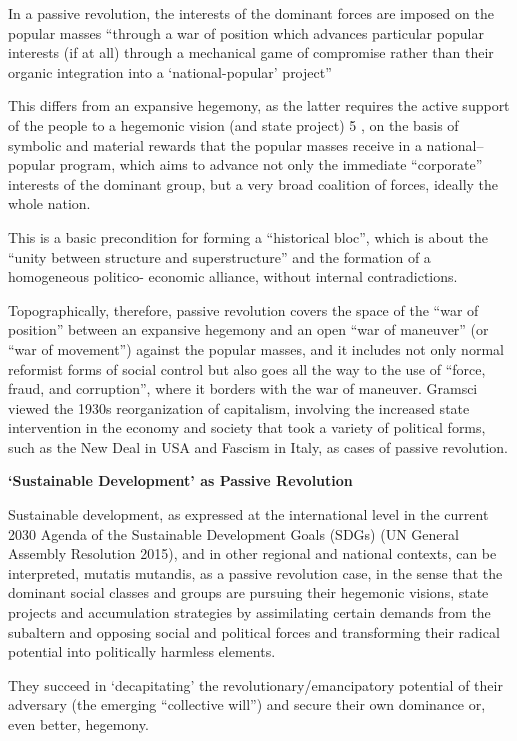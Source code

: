 \documentclass[
]{book}
\begin{document}
In
a passive revolution, the interests of the dominant forces are imposed on the popular masses ``through a war of
position which advances particular popular interests (if at all) through a mechanical game of compromise rather
than their organic integration into a `national-popular' project''

This differs from an
expansive hegemony, as the latter requires the active support of the people to a hegemonic vision (and state
project) 5 , on the basis of symbolic and material rewards that the popular masses receive in a national--popular
program, which aims to advance not only the immediate ``corporate'' interests of the dominant group, but a very
broad coalition of forces, ideally the whole nation.

This is a basic precondition for forming a ``historical bloc'',
which is about the ``unity between structure and superstructure'' and the formation of a homogeneous politico-
economic alliance, without internal contradictions.

Topographically, therefore,
passive revolution covers the space of the ``war of position'' between an expansive hegemony and an open ``war
of maneuver'' (or ``war of movement'') against the popular masses, and it includes not only normal reformist
forms of social control but also goes all the way to the use of ``force, fraud, and corruption'', where it borders
with the war of maneuver. Gramsci viewed the 1930s reorganization of capitalism, involving the increased state
intervention in the economy and society that took a variety of political forms, such as the New Deal in USA
and Fascism in Italy, as cases of passive revolution.

\textbf{`Sustainable Development' as Passive Revolution}

Sustainable development, as expressed at the international level in the current 2030 Agenda
of the Sustainable Development Goals (SDGs) (UN General Assembly Resolution 2015), and in other regional
and national contexts, can be interpreted, mutatis mutandis, as a passive revolution case, in the sense that the
dominant social classes and groups are pursuing their hegemonic visions, state projects and accumulation
strategies by assimilating certain demands from the subaltern and opposing social and political forces and
transforming their radical potential into politically harmless elements.

They succeed in `decapitating'
the revolutionary/emancipatory potential of their adversary (the emerging ``collective will'') and secure their
own dominance or, even better, hegemony.
\end{document}
